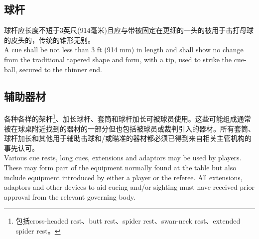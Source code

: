 \subsection{球杆}

\noindent 球杆应长度不短于3英尺(914毫米)且应与带被固定在更细的一头的被用于击打母球的皮头的，传统的锥形无别。\\
A cue shall be not less than 3 ft (914 mm) in length and shall show no change from the traditional tapered shape and form, with a tip, used to strike the cue-ball, secured to the thinner end.

\subsection{辅助器材}

\noindent 各种各样的架杆\footnote{包括cross-headed rest、butt rest、spider rest、swan-neck rest、extended spider rest。}、加长球杆、套筒和球杆加长可被球员使用。这些可能组成通常被在球桌附近找到的器材的一部分但也包括被球员或裁判引入的器材。所有套筒、球杆加长和其他用于辅助击球和/或瞄准的器材都必须已得到来自相关主管机构的事先认可。\\
Various cue rests, long cues, extensions and adaptors may be used by players. These may form part of the equipment normally found at the table but also include equipment introduced by either a player or the referee. All extensions, adaptors and other devices to aid cueing and/or sighting must have received prior approval from the relevant governing body.
